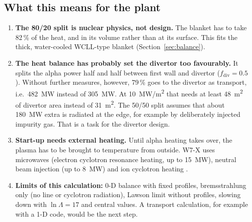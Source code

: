 \subsection{What this means for the plant}
\begin{enumerate}
\item \textbf{The 80/20 split is nuclear physics, not design.} The blanket has to take 82\,\% of the heat, and in its
  volume rather than at its surface. This fits the thick, water-cooled WCLL-type blanket (Section~\ref{sec:balance}).
\item \textbf{The heat balance has probably set the divertor too favourably.} It splits the alpha power half and half
  between first wall and divertor ($f_\mathrm{div} = 0.5$). Without further measures, however, 79\,\% goes to the
  divertor as transport, i.e.\ \SI{482}{MW} instead of \SI{305}{MW}. At \SI{10}{MW/m^2} that needs at least
  \SI{48}{m^2} of divertor area instead of \SI{31}{m^2}. The 50/50 split assumes that about \SI{180}{MW} extra is
  radiated at the edge, for example by deliberately injected impurity gas. That is a task for the divertor design.
\item \textbf{Start-up needs external heating.} Until alpha heating takes over, the plasma has to be brought to
  temperature from outside. W7-X uses microwaves (electron cyclotron resonance heating, up to \SI{15}{MW}), neutral beam
  injection (up to \SI{8}{MW}) and ion cyclotron heating \cite{wiki_w7x}.
\item \textbf{Limits of this calculation:} 0-D balance with fixed profiles, bremsstrahlung only (no line or cyclotron
  radiation), Lawson limit without profiles, slowing down with $\ln\Lambda = 17$ and central values. A transport
  calculation, for example with a 1-D code, would be the next step.
\end{enumerate}
